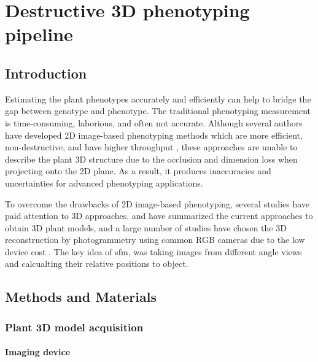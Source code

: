 \chapter{Destructive 3D phenotyping pipeline}

\section{Introduction}

Estimating the plant phenotypes accurately and efficiently can help to bridge the gap between genotype and phenotype. The traditional phenotyping measurement is time-consuming, laborious, and often not accurate. Although several authors have developed 2D image-based phenotyping methods which are more efficient, non-destructive, and have higher throughput \citep{yang_greenness_2015,guo_easypcc_2017,zou_broccoli_2019}, these approaches are unable to describe the plant 3D structure due to the occlusion and dimension loss when projecting onto the 2D plane. As a result, it produces inaccuracies and uncertainties for advanced phenotyping applications.

To overcome the drawbacks of 2D image-based phenotyping, several studies have paid attention to 3D approaches. \citet{paulus_measuring_2019} and \citet{kochi_introduction_2021} have summarized the current approaches to obtain 3D plant models, and a large number of studies have chosen the 3D reconstruction by photogrammetry using common RGB cameras due to the low device cost \citep{xiao_estimating_2021,zermas_3d_2020,zhang_estimating_2016}. The key idea of sfm, was taking images from different angle views and calcualting their relative positions to object.






\section{Methods and Materials}

\subsection{Plant 3D model acquisition}


\subsubsection{Imaging device}

